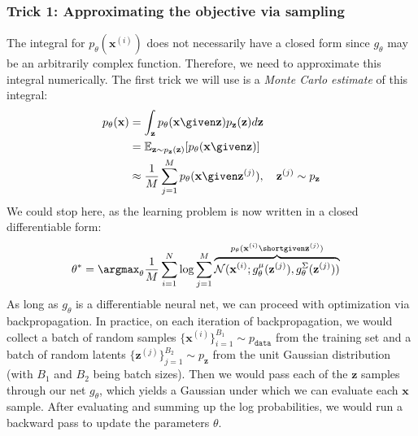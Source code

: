 \subsubsection{Trick 1: Approximating the objective via sampling} 
The integral for $p_{\theta}(\mathbf{x}^{(i)})$ does not necessarily have a closed form since $g_{\theta}$ may be an arbitrarily complex function. Therefore, we need to approximate this integral numerically. The first trick we will use is a \textit{Monte Carlo estimate} of this integral:
\begin{align}
    p_{\theta}(\mathbf{x}) &= \int_{\mathbf{z}} p_{\theta}(\mathbf{x} \given \mathbf{z})p_{\mathbf{z}}(\mathbf{z})d\mathbf{z} \label{eqn:generative_models_and_representation_learning:vae_likelihood}\\
    &= \mathbb{E}_{\mathbf{z}\sim p_{\mathbf{z}}(\mathbf{z})}[p_{\theta}(\mathbf{x} \given \mathbf{z})]\\
    &\approx \frac{1}{M} \sum_{j=1}^M p_{\theta}(\mathbf{x} \given \mathbf{z}^{(j)}), \quad \mathbf{z}^{(j)} \sim p_{\mathbf{z}} \label{eqn:generative_models_and_representation_learning:vae_likelihood_monte_carlo_estimate}
\end{align}
We could stop here, as the learning problem is now written in a closed differentiable form:
\begin{align}
    \theta^* &= \argmax_{\theta} \frac{1}{M} \sum_{i=1}^N \log \sum_{j=1}^M \overbrace{\mathcal{N}(\mathbf{x}^{(i)}; g^{\mu}_{\theta}(\mathbf{z}^{(j)}), g^{\Sigma}_{\theta}(\mathbf{z}^{(j)}))}^{p_{\theta}(\mathbf{x}^{(i)} \shortgiven \mathbf{z}^{(j)})}\label{eqn:generative_modeling_and_representation_learning:vae_learning_problem1}
\end{align}
As long as $g_{\theta}$ is a differentiable neural net, we can proceed with optimization via backpropagation. In practice, on each iteration of backpropagation, we would collect a batch of random samples $\{\mathbf{x}^{(i)}\}_{i=1}^{B_1} \sim p_{\texttt{data}}$ from the training set and a batch of random latents $\{\mathbf{z}^{(j)}\}_{j=1}^{B_2} \sim p_{\mathbf{z}}$ from the unit Gaussian distribution (with $B_1$ and $B_2$ being batch sizes). Then we would pass each of the $\mathbf{z}$ samples through our net $g_{\theta}$, which yields a Gaussian under which we can evaluate each $\mathbf{x}$ sample. After evaluating and summing up the log probabilities, we would run a backward pass to update the parameters $\theta$.

